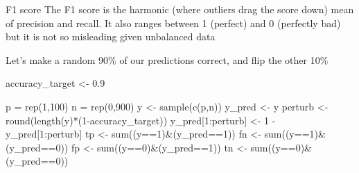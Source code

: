 \documentclass[
  10pt,
  ignorenonframetext,
  aspectratio=169]{beamer}
\newenvironment{Shaded}{\begin{snugshade}}{\end{snugshade}}
\newcommand{\DecValTok}[1]{\textcolor[rgb]{0.86,0.86,0.80}{#1}}
\newcommand{\FloatTok}[1]{\textcolor[rgb]{0.75,0.75,0.82}{#1}}
\newcommand{\FunctionTok}[1]{\textcolor[rgb]{0.94,0.94,0.56}{#1}}
\newcommand{\NormalTok}[1]{\textcolor[rgb]{0.80,0.80,0.80}{#1}}
\newcommand{\OtherTok}[1]{\textcolor[rgb]{0.94,0.94,0.56}{#1}}
\newcommand{\SpecialCharTok}[1]{\textcolor[rgb]{0.86,0.64,0.64}{#1}}
\begin{document}
\begin{frame}[fragile]{F1 score}
\protect\hypertarget{f1-score}{}
The F1 score is the harmonic (where outliers drag the score down) mean
of precision and recall. It also ranges between 1 (perfect) and 0
(perfectly bad) but it is not so misleading given unbalanced data

\medskip

Let's make a random 90\% of our predictions correct, and flip the other
10\%

\medskip

\scriptsize

\begin{Shaded}
\begin{Highlighting}[]
\NormalTok{accuracy\_target }\OtherTok{\textless{}{-}} \FloatTok{0.9}

\NormalTok{p }\OtherTok{=} \FunctionTok{rep}\NormalTok{(}\DecValTok{1}\NormalTok{,}\DecValTok{100}\NormalTok{)}
\NormalTok{n }\OtherTok{=} \FunctionTok{rep}\NormalTok{(}\DecValTok{0}\NormalTok{,}\DecValTok{900}\NormalTok{)}
\NormalTok{y }\OtherTok{\textless{}{-}} \FunctionTok{sample}\NormalTok{(}\FunctionTok{c}\NormalTok{(p,n))}
\NormalTok{y\_pred }\OtherTok{\textless{}{-}}\NormalTok{ y}
\NormalTok{perturb }\OtherTok{\textless{}{-}} \FunctionTok{round}\NormalTok{(}\FunctionTok{length}\NormalTok{(y)}\SpecialCharTok{*}\NormalTok{(}\DecValTok{1}\SpecialCharTok{{-}}\NormalTok{accuracy\_target))}
\NormalTok{y\_pred[}\DecValTok{1}\SpecialCharTok{:}\NormalTok{perturb] }\OtherTok{\textless{}{-}} \DecValTok{1} \SpecialCharTok{{-}}\NormalTok{ y\_pred[}\DecValTok{1}\SpecialCharTok{:}\NormalTok{perturb]}
\NormalTok{tp }\OtherTok{\textless{}{-}} \FunctionTok{sum}\NormalTok{((y}\SpecialCharTok{==}\DecValTok{1}\NormalTok{)}\SpecialCharTok{\&}\NormalTok{(y\_pred}\SpecialCharTok{==}\DecValTok{1}\NormalTok{))}
\NormalTok{fn }\OtherTok{\textless{}{-}} \FunctionTok{sum}\NormalTok{((y}\SpecialCharTok{==}\DecValTok{1}\NormalTok{)}\SpecialCharTok{\&}\NormalTok{(y\_pred}\SpecialCharTok{==}\DecValTok{0}\NormalTok{))}
\NormalTok{fp }\OtherTok{\textless{}{-}} \FunctionTok{sum}\NormalTok{((y}\SpecialCharTok{==}\DecValTok{0}\NormalTok{)}\SpecialCharTok{\&}\NormalTok{(y\_pred}\SpecialCharTok{==}\DecValTok{1}\NormalTok{))}
\NormalTok{tn }\OtherTok{\textless{}{-}} \FunctionTok{sum}\NormalTok{((y}\SpecialCharTok{==}\DecValTok{0}\NormalTok{)}\SpecialCharTok{\&}\NormalTok{(y\_pred}\SpecialCharTok{==}\DecValTok{0}\NormalTok{))}


\end{Highlighting}
\end{Shaded}
\end{frame}
\end{document}
